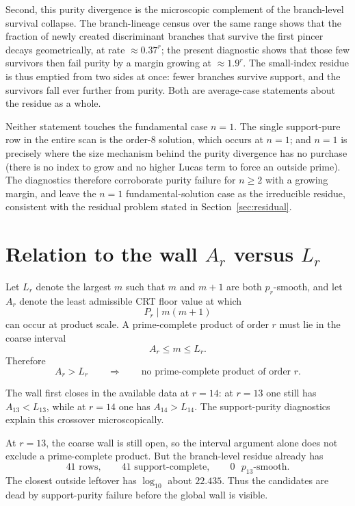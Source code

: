\documentclass[11pt]{article}
\theoremstyle{definition}
\begin{document}
Second, this purity divergence is the microscopic complement of the branch-level
survival collapse.  The branch-lineage census over the same range shows that the
fraction of newly created discriminant branches that survive the first pincer
decays geometrically, at rate $\approx 0.37^{r}$; the present diagnostic shows
that those few survivors then fail purity by a margin growing at $\approx 1.9^{r}$.
The small-index residue is thus emptied from two sides at once: fewer branches
survive support, and the survivors fall ever further from purity.  Both are
average-case statements about the residue as a whole.

Neither statement touches the fundamental case $n=1$.  The single support-pure
row in the entire scan is the order-$8$ solution, which occurs at $n=1$; and $n=1$
is precisely where the size mechanism behind the purity divergence has no purchase
(there is no index to grow and no higher Lucas term to force an outside prime).
The diagnostics therefore corroborate purity failure for $n\ge 2$ with a growing
margin, and leave the $n=1$ fundamental-solution case as the irreducible residue,
consistent with the residual problem stated in Section~\ref{sec:residual}.

\section{Relation to the wall $A_r$ versus $L_r$}

Let $L_r$ denote the largest $m$ such that $m$ and $m+1$ are both $p_r$-smooth,
and let $A_r$ denote the least admissible CRT floor value at which
\[
  P_r\mid m(m+1)
\]
can occur at product scale.  A prime-complete product of order $r$ must lie in
the coarse interval
\[
  A_r\le m\le L_r.
\]
Therefore
\[
  A_r>L_r
  \qquad\Longrightarrow\qquad
  \text{no prime-complete product of order }r.
\]

The wall first closes in the available data at $r=14$: at $r=13$ one still has
$A_{13}<L_{13}$, while at $r=14$ one has $A_{14}>L_{14}$.  The support-purity
diagnostics explain this crossover microscopically.

At $r=13$, the coarse wall is still open, so the interval argument alone does not
exclude a prime-complete product.  But the branch-level residue already has
\[
  41\text{ rows},\qquad 41\text{ support-complete},\qquad 0\text{ }p_{13}\text{-smooth}.
\]
The closest outside leftover has $\log_{10}$ about $22.435$.  Thus the candidates
are dead by support-purity failure before the global wall is visible.
\end{document}
